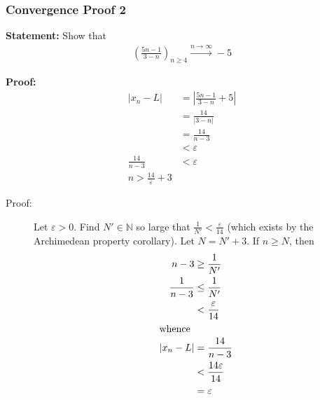 \documentclass[10pt]{extarticle}
\newcommand{\N}{\mathbb{N}}
\begin{document}
      \subsubsection{Convergence Proof 2}%
      \textbf{Statement:} Show that
      \begin{align*}
        \left(\frac{5n-1}{3-n}\right)_{n\geq 4} \xrightarrow{n\rightarrow\infty} -5
      \end{align*}

      \textbf{Proof:}
      \begin{align*}
        |x_n - L| &= \left|\frac{5n-1}{3-n} + 5\right|\\
                  &= \frac{14}{|3-n|}\\
                  &= \frac{14}{n-3}\\
                  &< \varepsilon\\
        \frac{14}{n-3} &< \varepsilon\\
        n > \frac{14}{\varepsilon} + 3
      \end{align*}
      \begin{description}
        \item[Proof:] Let $\varepsilon > 0$. Find $N' \in\N$ so large that $\frac{1}{N'} < \frac{\varepsilon}{14}$ (which exists by the Archimedean property corollary). Let $N = N' + 3$. If $n \geq N$, then
          \begin{align*}
            n-3 &\geq \frac{1}{N'}\\
            \frac{1}{n-3} &\leq \frac{1}{N'}\\
                          &< \frac{\varepsilon}{14}\\
                          \shortintertext{whence}
            |x_n - L| &= \frac{14}{n-3}\\
                      &< \frac{14\varepsilon}{14}\\
                      &= \varepsilon
          \end{align*}
      \end{description}
\end{document}
